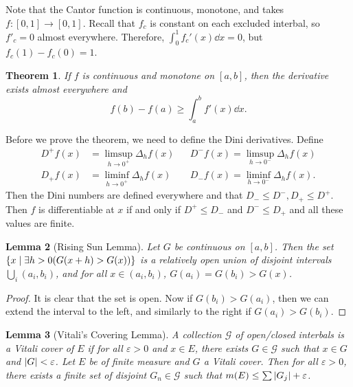 \documentclass[leqno, openany]{memoir}
\newtheorem{thm}{Theorem}[chapter]
\newtheorem{lem}[thm]{Lemma}
\theoremstyle{definition}
\theoremstyle{remark}
\theoremstyle{plain}
\theoremstyle{definition}
\theoremstyle{remark}
\newcommand{\ep}{\varepsilon}
\newcommand{\mc}[1]{\mathcal{#1}}
\begin{document}
Note that the Cantor function is continuous, monotone, and takes $f: [0,1] \to [0,1]$. Recall that $f_c$ is constant on each excluded interbal, so $f'_c = 0$ almost everywhere. Therefore, $\int_0^1 f_c'(x) \dd{x} = 0$, but $f_c(1) - f_c(0) = 1$.

\begin{thm}
    If $f$ is continuous and monotone on $[a,b]$, then the derivative exists almost everywhere and
    \[ f(b) - f(a) \geq \int_a^b f'(x) \dd{x}. \]
\end{thm}

Before we prove the theorem, we need to define the Dini derivatives. Define
\begin{align*}
    D^+ f(x) &= \limsup_{h \to 0^+} \Delta_h f(x) & & D^- f(x) = \limsup_{h \to 0^-} \Delta_h f(x) \\
    D_+ f(x) &= \liminf_{h \to 0^+} \Delta_h f(x) & & D_- f(x) = \liminf_{h \to 0^-} \Delta_h f(x).
\end{align*}
Then the Dini numbers are defined everywhere and that $D_- \leq D^-, D_+ \leq D^+$. Then $f$ is differentiable at $x$ if and only if $D^+ \leq D_-$ and $D^- \leq D_+$ and all these values are finite.

\begin{lem}[Rising Sun Lemma]
    Let $G$ be continuous on $[a,b]$. Then the set $\qty{x \mid \exists h > 0 (G(x+h) > G(x))}$ is a relatively open union of disjoint intervals $\bigcup_i (a_i,b_i)$, and for all $x \in (a_i, b_i)$, $G(a_i) = G(b_i) > G(x)$. 
\end{lem}

\begin{proof}
    It is clear that the set is open. Now if $G(b_i) > G(a_i)$, then we can extend the interval to the left, and similarly to the right if $G(a_i) > G(b_i)$.
\end{proof}

\begin{lem}[Vitali's Covering Lemma]
    A collection $\mc{G}$ of open/closed interbals is a \textit{Vitali cover} of $E$ if for all $\ep > 0$ and $x \in E$, there exists $G \in \mc{G}$ such that $x \in G$ and $\abs{G} < \ep$. Let $E$ be of finite measure and $G$ a Vitali cover. Then for all $\ep > 0$, there exists a finite set of disjoint $G_n \in \mc{G}$ such that $m(E) \leq \sum \abs{G_j} + \ep$.
\end{lem}
\end{document}
